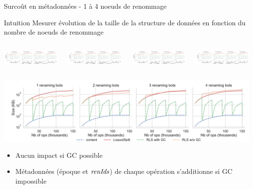\begin{frame}{Surcoût en métadonnées - 1 à 4 noeuds de renommage}
  \begin{block}{Intuition}
    Mesurer évolution de la taille de la structure de données \alert{en fonction du nombre de noeuds de renommage}
  \end{block}
  \begin{columns}
    \begin{column}{0.25\textwidth}
      \includegraphics[width=1.15\columnwidth,trim=1.6cm 0.8cm 35.8cm 0cm, clip]{img/2022-12-07-snapshot-sizes-1-4-rb.pdf}
    \end{column}
    \begin{column}{0.25\textwidth}
      \includegraphics<2->[width=\columnwidth,trim=15cm 0.8cm 24cm 0cm, clip]{img/2022-12-07-snapshot-sizes-1-4-rb.pdf}
    \end{column}
    \begin{column}{0.25\textwidth}
      \includegraphics<3->[width=\columnwidth,trim=27cm 0.8cm 12cm 0cm, clip]{img/2022-12-07-snapshot-sizes-1-4-rb.pdf}
    \end{column}
    \begin{column}{0.25\textwidth}
      \includegraphics<4->[width=\columnwidth,trim=39cm 0.8cm 0cm 0cm, clip]{img/2022-12-07-snapshot-sizes-1-4-rb.pdf}
    \end{column}
  \end{columns}
  \vspace{-1em}
  \begin{center}
    \includegraphics[width=\columnwidth,trim=2cm 0cm 2cm 12cm, clip]{img/2022-12-07-snapshot-sizes-1-4-rb.pdf}
  \end{center}
  \begin{itemize}
    \item<5> Aucun impact si GC possible
    \item<5> Métadonnées (époque et $\mathit{renIds}$) de chaque opération \ren s'additionne si GC impossible
  \end{itemize}
\end{frame}

